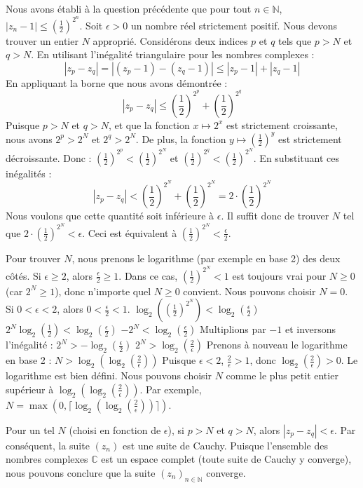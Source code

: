\documentclass[a4paper,11pt]{report}
\begin{document}
Nous avons établi à la question précédente que pour tout $n \in \mathbb{N}$, $|z_n - 1| \le \left(\frac{1}{2}\right)^{2^n}$.
Soit $\epsilon > 0$ un nombre réel strictement positif. Nous devons trouver un entier $N$ approprié.
Considérons deux indices $p$ et $q$ tels que $p > N$ et $q > N$.
En utilisant l'inégalité triangulaire pour les nombres complexes :
$$|z_p - z_q| = |(z_p - 1) - (z_q - 1)| \le |z_p - 1| + |z_q - 1|$$
En appliquant la borne que nous avons démontrée :
$$|z_p - z_q| \le \left(\frac{1}{2}\right)^{2^p} + \left(\frac{1}{2}\right)^{2^q}$$
Puisque $p > N$ et $q > N$, et que la fonction $x \mapsto 2^x$ est strictement croissante, nous avons $2^p > 2^N$ et $2^q > 2^N$.
De plus, la fonction $y \mapsto \left(\frac{1}{2}\right)^y$ est strictement décroissante. Donc :
$\left(\frac{1}{2}\right)^{2^p} < \left(\frac{1}{2}\right)^{2^N}$ et $\left(\frac{1}{2}\right)^{2^q} < \left(\frac{1}{2}\right)^{2^N}$.
En substituant ces inégalités :
$$|z_p - z_q| < \left(\frac{1}{2}\right)^{2^N} + \left(\frac{1}{2}\right)^{2^N} = 2 \cdot \left(\frac{1}{2}\right)^{2^N}$$
Nous voulons que cette quantité soit inférieure à $\epsilon$. Il suffit donc de trouver $N$ tel que $2 \cdot \left(\frac{1}{2}\right)^{2^N} < \epsilon$.
Ceci est équivalent à $\left(\frac{1}{2}\right)^{2^N} < \frac{\epsilon}{2}$.

Pour trouver $N$, nous prenons le logarithme (par exemple en base 2) des deux côtés.
Si $\epsilon \ge 2$, alors $\frac{\epsilon}{2} \ge 1$. Dans ce cas, $\left(\frac{1}{2}\right)^{2^N} < 1$ est toujours vrai pour $N \ge 0$ (car $2^N \ge 1$), donc n'importe quel $N \ge 0$ convient. Nous pouvons choisir $N=0$.
Si $0 < \epsilon < 2$, alors $0 < \frac{\epsilon}{2} < 1$.
$\log_2\left(\left(\frac{1}{2}\right)^{2^N}\right) < \log_2\left(\frac{\epsilon}{2}\right)$
$2^N \log_2\left(\frac{1}{2}\right) < \log_2\left(\frac{\epsilon}{2}\right)$
$-2^N < \log_2\left(\frac{\epsilon}{2}\right)$
Multiplions par $-1$ et inversons l'inégalité :
$2^N > -\log_2\left(\frac{\epsilon}{2}\right)$
$2^N > \log_2\left(\frac{2}{\epsilon}\right)$
Prenons à nouveau le logarithme en base 2 :
$N > \log_2\left(\log_2\left(\frac{2}{\epsilon}\right)\right)$
Puisque $\epsilon < 2$, $\frac{2}{\epsilon} > 1$, donc $\log_2\left(\frac{2}{\epsilon}\right) > 0$. Le logarithme est bien défini.
Nous pouvons choisir $N$ comme le plus petit entier supérieur à $\log_2\left(\log_2\left(\frac{2}{\epsilon}\right)\right)$. Par exemple, $N = \max(0, \lceil \log_2(\log_2(\frac{2}{\epsilon})) \rceil)$.

Pour un tel $N$ (choisi en fonction de $\epsilon$), si $p > N$ et $q > N$, alors $|z_p - z_q| < \epsilon$.
Par conséquent, la suite $(z_n)$ est une suite de Cauchy.
Puisque l'ensemble des nombres complexes $\mathbb{C}$ est un espace complet (toute suite de Cauchy y converge), nous pouvons conclure que la suite $(z_n)_{n \in \mathbb{N}}$ converge.
\end{document}
